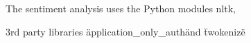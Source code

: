 \documentclass[Main]{subfiles}
\begin{document}



The sentiment analysis uses the Python modules nltk, 

3rd party libraries \"application_only_auth\" and \"twokenize\"
\end{document}
